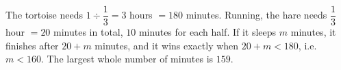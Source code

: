 The tortoise needs $1\div\dfrac13=3$ hours $=180$ minutes. Running, the hare needs $\dfrac13$ hour $=20$ minutes in total, $10$ minutes for each half. If it sleeps $m$ minutes, it finishes after $20+m$ minutes, and it wins exactly when $20+m<180$, i.e. $m<160$. The largest whole number of minutes is $\boxed{159}$.
